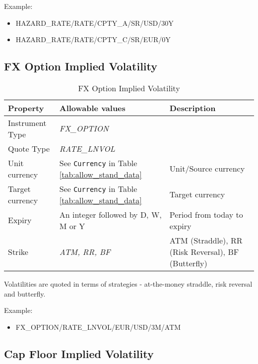 Example:
\begin{itemize}
\item {HAZARD\_RATE/RATE/CPTY\_A/SR/USD/30Y}
\item{HAZARD\_RATE/RATE/CPTY\_C/SR/EUR/0Y}
\end{itemize}

\subsection{FX Option Implied Volatility}

\begin{table}[H]
\centering
\begin{tabular}{|p{3cm}|p{3.5cm}|p{7cm}|}
\hline
{\bf Property} & {\bf Allowable values} & {\bf Description} \\
\hline
  Instrument Type & \emph{FX\_OPTION} & \\ \hline
  Quote Type & \emph{RATE\_LNVOL} & \\ \hline
  Unit currency & See \lstinline!Currency! in Table \ref{tab:allow_stand_data}& Unit/Source currency\\ \hline
  Target currency & See \lstinline!Currency! in Table \ref{tab:allow_stand_data} & Target currency\\ \hline
  Expiry & An integer followed by D, W, M or Y & Period from today to expiry \\ \hline
  Strike & \emph{ATM, RR, BF} & ATM (Straddle), RR (Risk Reversal), BF (Butterfly) \\
\hline
\end{tabular}
  \caption{FX Option Implied Volatility}
  \label{tab:fximplvol_quote}
\end{table}

Volatilities are quoted in terms of strategies - at-the-money straddle, risk reversal and butterfly.

\medskip
Example:
\begin{itemize}
\item {FX\_OPTION/RATE\_LNVOL/EUR/USD/3M/ATM}
\end{itemize}

\subsection{Cap Floor Implied Volatility}\label{ss:capfloor_impl_vol_quote}

